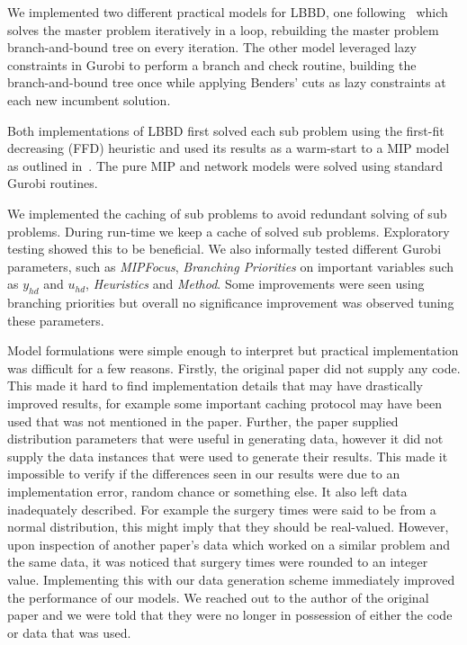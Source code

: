 We implemented two different practical models for LBBD, one following~\cite{roshanaei2017propagating} which solves the master problem iteratively in a loop, rebuilding the master problem branch-and-bound tree on every iteration. The other model leveraged lazy constraints in Gurobi to perform a branch and check routine\cite{LBBDBible}, building the branch-and-bound tree once while applying Benders' cuts as lazy constraints at each new incumbent solution. 

Both implementations of LBBD first solved each sub problem using the first-fit decreasing (FFD) heuristic\cite{Fazel} and used its results as a warm-start to a MIP model as outlined in~\cite{roshanaei2017propagating}. The pure MIP and network models were solved using standard Gurobi routines. 

We implemented the caching of sub problems to avoid redundant solving of sub problems. During run-time we keep a cache of solved sub problems. Exploratory testing showed this to be beneficial. We also informally tested different Gurobi parameters, such as \textit{MIPFocus}, \textit{Branching Priorities} on important variables such as $y_{hd}$ and $u_{hd}$, \textit{Heuristics} and \textit{Method}. Some improvements were seen using branching priorities but overall no significance improvement was observed tuning these parameters. 

Model formulations were simple enough to interpret but practical implementation was difficult for a few reasons. Firstly, the original paper did not supply any code. This made it hard to find implementation details that may have drastically improved results, for example some important caching protocol may have been used that was not mentioned in the paper. Further, the paper supplied distribution parameters that were useful in generating data, however it did not supply the data instances that were used to generate their results. This made it impossible to verify if the differences seen in our results were due to an implementation error, random chance or something else. It also left data inadequately described. For example the surgery times were said to be from a normal distribution, this might imply that they should be real-valued. However, upon inspection of another paper's data which worked on a similar problem\cite{guo} and the same data, it was noticed that surgery times were rounded to an integer value. Implementing this with our data generation scheme immediately improved the performance of our models. We reached out to the author of the original paper and we were told that they were no longer in possession of either the code or data that was used. 

